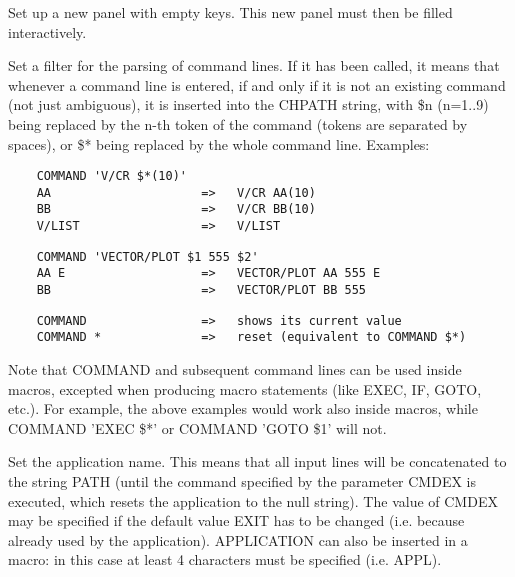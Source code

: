    \par
Set up a new panel with empty keys.  This new panel must then be filled 
   interactively.  

\ENDCMD


\BEGARG
{}
\ENDARG

   \par
Set a filter for the parsing of command lines.  If it has been called, it 
   means that whenever a command line is entered, if and only if it is not an 
   existing command (not just ambiguous), it is inserted into the CHPATH 
   string, with \$n (n=1..9) being replaced by the n-th token of the command 
   (tokens are separated by spaces), or \$* being replaced by the whole 
   command line. Examples:  
\begin{verbatim}
    COMMAND 'V/CR $*(10)'
    AA                     =>   V/CR AA(10)
    BB                     =>   V/CR BB(10)
    V/LIST                 =>   V/LIST
\end{verbatim}
\begin{verbatim}
    COMMAND 'VECTOR/PLOT $1 555 $2'
    AA E                   =>   VECTOR/PLOT AA 555 E
    BB                     =>   VECTOR/PLOT BB 555
\end{verbatim}
\begin{verbatim}
    COMMAND                =>   shows its current value
    COMMAND *              =>   reset (equivalent to COMMAND $*)
\end{verbatim}
   \par
Note that COMMAND and subsequent command lines can be used inside macros, 
   excepted when producing macro statements (like EXEC, IF, GOTO, etc.).  For 
   example, the above examples would work also inside macros, while COMMAND 
   'EXEC \$*' or COMMAND 'GOTO \$1' will not.  

\ENDCMD


\BEGARG
{}
\ENDARG

   \par
Set the application name.  This means that all input lines will be 
   concatenated to the string PATH (until the command specified by the 
   parameter CMDEX is executed, which resets the application to the null 
   string). The value of CMDEX may be specified if the default value EXIT has 
   to be changed (i.e. because already used by the application).  APPLICATION 
   can also be inserted in a macro: in this case at least 4 characters must be 
   specified (i.e. APPL).  

